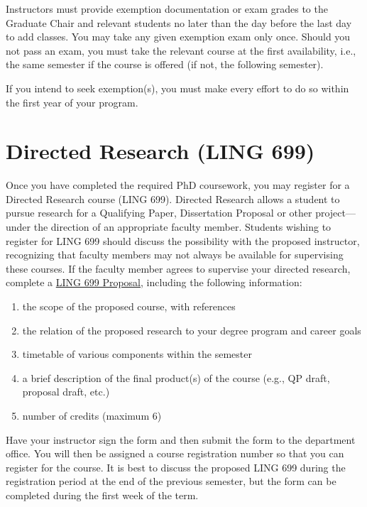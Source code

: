 \documentclass[
]{book}
\providecommand{\tightlist}{%
  \setlength{\itemsep}{0pt}\setlength{\parskip}{0pt}}
\begin{document}
Instructors must provide exemption documentation or exam grades to the Graduate Chair and relevant students no later than the day before the last day to add classes. You may take any given exemption exam only once. Should you not pass an exam, you must take the relevant course at the first availability, i.e., the same semester if the course is offered (if not, the following semester).

If you intend to seek exemption(s), you must make every effort to do so within the first year of your program.

\section{Directed Research (LING 699)}\label{ling699}

Once you have completed the required PhD coursework, you may register for a Directed Research course (LING 699). Directed Research allows a student to pursue research for a Qualifying Paper, Dissertation Proposal or other project---under the direction of an appropriate faculty member. Students wishing to register for LING 699 should discuss the possibility with the proposed instructor, recognizing that faculty members may not always be available for supervising these courses. If the faculty member agrees to supervise your directed research, complete a \href{files/699form.pdf}{LING 699 Proposal}, including the following information:

\begin{enumerate}
\def\labelenumi{\arabic{enumi}.}
\tightlist
\item
  the scope of the proposed course, with references
\item
  the relation of the proposed research to your degree program and career goals
\item
  timetable of various components within the semester
\item
  a brief description of the final product(s) of the course (e.g., QP draft, proposal draft, etc.)
\item
  number of credits (maximum 6)
\end{enumerate}

Have your instructor sign the form and then submit the form to the department office. You will then be assigned a course registration number so that you can register for the course. It is best to discuss the proposed LING 699 during the registration period at the end of the previous semester, but the form can be completed during the first week of the term.
\end{document}
